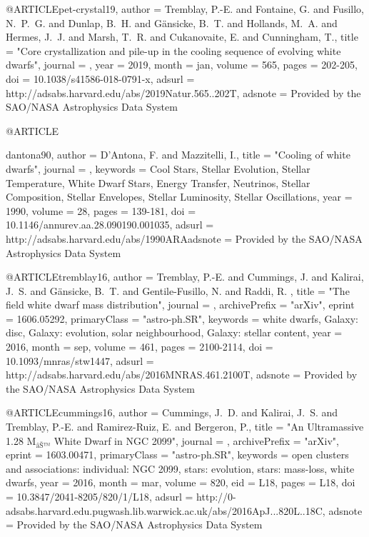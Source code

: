\documentclass[a4paper,fleqn,usenatbib]{mnras}
\begin{document}
{{{{{{{{{{@ARTICLE{pet-crystal19,
   author = {{Tremblay}, P.-E. and {Fontaine}, G. and {Fusillo}, N.~P.~G. and 
	{Dunlap}, B.~H. and {G{\"a}nsicke}, B.~T. and {Hollands}, M.~A. and 
	{Hermes}, J.~J. and {Marsh}, T.~R. and {Cukanovaite}, E. and 
	{Cunningham}, T.},
    title = "{Core crystallization and pile-up in the cooling sequence of evolving white dwarfs}",
  journal = {\nat},
     year = 2019,
    month = jan,
   volume = 565,
    pages = {202-205},
      doi = {10.1038/s41586-018-0791-x},
   adsurl = {http://adsabs.harvard.edu/abs/2019Natur.565..202T},
  adsnote = {Provided by the SAO/NASA Astrophysics Data System}
}

@ARTICLE{dantona90,
   author = {{D'Antona}, F. and {Mazzitelli}, I.},
    title = "{Cooling of white dwarfs}",
  journal = {\araa},
 keywords = {Cool Stars, Stellar Evolution, Stellar Temperature, White Dwarf Stars, Energy Transfer, Neutrinos, Stellar Composition, Stellar Envelopes, Stellar Luminosity, Stellar Oscillations},
     year = 1990,
   volume = 28,
    pages = {139-181},
      doi = {10.1146/annurev.aa.28.090190.001035},
   adsurl = {http://adsabs.harvard.edu/abs/1990ARAadsnote = {Provided by the SAO/NASA Astrophysics Data System}
}

@ARTICLE{tremblay16,
   author = {{Tremblay}, P.-E. and {Cummings}, J. and {Kalirai}, J.~S. and 
	{G{\"a}nsicke}, B.~T. and {Gentile-Fusillo}, N. and {Raddi}, R.
	},
    title = "{The field white dwarf mass distribution}",
  journal = {\mnras},
archivePrefix = "arXiv",
   eprint = {1606.05292},
 primaryClass = "astro-ph.SR",
 keywords = {white dwarfs, Galaxy: disc, Galaxy: evolution, solar neighbourhood, Galaxy: stellar content},
     year = 2016,
    month = sep,
   volume = 461,
    pages = {2100-2114},
      doi = {10.1093/mnras/stw1447},
   adsurl = {http://adsabs.harvard.edu/abs/2016MNRAS.461.2100T},
  adsnote = {Provided by the SAO/NASA Astrophysics Data System}
}


@ARTICLE{cummings16,
   author = {{Cummings}, J.~D. and {Kalirai}, J.~S. and {Tremblay}, P.-E. and 
	{Ramirez-Ruiz}, E. and {Bergeron}, P.},
    title = "{An Ultramassive 1.28 M$_{â}$ White Dwarf in NGC 2099}",
  journal = {\apjl},
archivePrefix = "arXiv",
   eprint = {1603.00471},
 primaryClass = "astro-ph.SR",
 keywords = {open clusters and associations: individual: NGC 2099, stars: evolution, stars: mass-loss, white dwarfs},
     year = 2016,
    month = mar,
   volume = 820,
      eid = {L18},
    pages = {L18},
      doi = {10.3847/2041-8205/820/1/L18},
   adsurl = {http://0-adsabs.harvard.edu.pugwash.lib.warwick.ac.uk/abs/2016ApJ...820L..18C},
  adsnote = {Provided by the SAO/NASA Astrophysics Data System}
}

}}}}}}}}}}}
\end{document}
